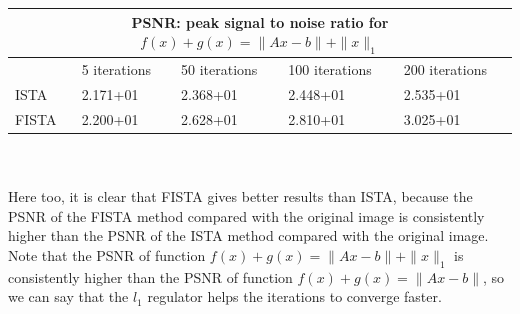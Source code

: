 \documentclass[12pt]{article}
\begin{document}
\begin{tabular}{ |p{1.5cm}|p{2.5cm}|p{2.5cm}|p{2.5cm}|p{2.5cm}|  }
 \hline
 \multicolumn{5}{|c|}{PSNR: peak signal to noise ratio for $f(x)+g(x)=\|Ax-b\|+ \|x\|_1$} \\
 \hline
  & 5 iterations & 50 iterations & 100 iterations & 200 iterations\\
 \hline
 ISTA  & 2.171+01 & 2.368+01 & 2.448+01 & 2.535+01\\
 FISTA & 2.200+01 & 2.628+01 & 2.810+01 & 3.025+01\\
 \hline
\end{tabular} \\
\\Here too, it is clear that FISTA gives better results than ISTA, because the PSNR of the FISTA method compared with the original image is consistently higher than the PSNR of the ISTA method compared with the original image.\\ 
Note that the PSNR of function $f(x)+g(x)=\|Ax-b\|+ \|x\|_1$ is consistently higher than the PSNR of function $f(x)+g(x)=\|Ax-b\|$, so we can say that the $l_1$ regulator helps the iterations to converge faster. \\
\newpage
\end{document}
